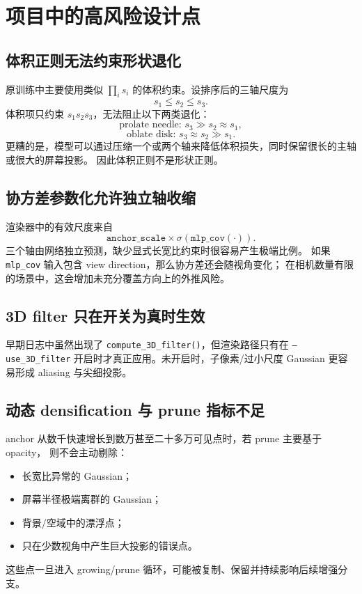 \documentclass[11pt,a4paper]{article}
\begin{document}
\section{项目中的高风险设计点}

\subsection{体积正则无法约束形状退化}

原训练中主要使用类似 \(\prod_i s_i\) 的体积约束。设排序后的三轴尺度为
\[
  s_1 \le s_2 \le s_3 .
\]
体积项只约束 \(s_1s_2s_3\)，无法阻止以下两类退化：
\[
  \text{prolate needle: } s_3 \gg s_2 \approx s_1,
\]
\[
  \text{oblate disk: } s_3 \approx s_2 \gg s_1 .
\]
更糟的是，模型可以通过压缩一个或两个轴来降低体积损失，同时保留很长的主轴或很大的屏幕投影。
因此体积正则不是形状正则。

\subsection{协方差参数化允许独立轴收缩}

渲染器中的有效尺度来自
\[
  \texttt{anchor\_scale} \times \sigma(\texttt{mlp\_cov}(\cdot)).
\]
三个轴由网络独立预测，缺少显式长宽比约束时很容易产生极端比例。
如果 \texttt{mlp\_cov} 输入包含 view direction，那么协方差还会随视角变化；
在相机数量有限的场景中，这会增加未充分覆盖方向上的外推风险。

\subsection{3D filter 只在开关为真时生效}

早期日志中虽然出现了 \texttt{compute\_3D\_filter()}，但渲染路径只有在
\texttt{--use\_3D\_filter} 开启时才真正应用。未开启时，子像素/过小尺度 Gaussian 更容易形成 aliasing 与尖细投影。

\subsection{动态 densification 与 prune 指标不足}

anchor 从数千快速增长到数万甚至二十多万可见点时，若 prune 主要基于 opacity，
则不会主动剔除：
\begin{itemize}[leftmargin=1.5em]
  \item 长宽比异常的 Gaussian；
  \item 屏幕半径极端离群的 Gaussian；
  \item 背景/空域中的漂浮点；
  \item 只在少数视角中产生巨大投影的错误点。
\end{itemize}
这些点一旦进入 growing/prune 循环，可能被复制、保留并持续影响后续增强分支。
\end{document}
